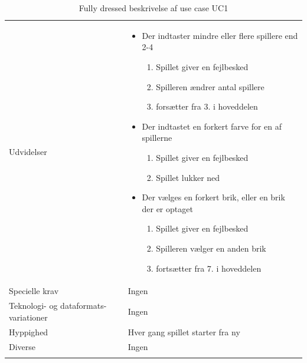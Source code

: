 \begin{center}
\begin{longtable}{ |l|p{10.7cm}|}
\begin{minipage}[t]{1\textwidth}
  \end{minipage}
  \\
 \hline
 Udvidelser & 
\begin{minipage}[t]{1\textwidth}
 \begin{itemize}
     \item Der indtaster mindre eller flere spillere end 2-4
        \begin{enumerate}
            \item Spillet giver en fejlbesked
            \item Spilleren ændrer antal spillere
            \item forsætter fra 3. i hoveddelen
        \end{enumerate}
    \item Der indtastet en forkert farve for en af spillerne
    \begin{enumerate}
        \item Spillet giver en fejlbesked
        \item Spillet lukker ned
    \end{enumerate}
    \item Der vælges en forkert brik, eller en brik der er optaget
    \begin{enumerate}
        \item Spillet giver en fejlbesked
        \item Spilleren vælger en anden brik
        \item fortsætter fra 7. i hoveddelen
    \end{enumerate}
 \end{itemize}
\end{minipage}
 
 \\
 \hline
 Specielle krav & Ingen \\
 \hline
 Teknologi- og dataformats-variationer & Ingen \\
 \hline
 Hyppighed & Hver gang spillet starter fra ny \\
 \hline
 Diverse & Ingen \\
 \hline
\caption{Fully dressed beskrivelse af use case UC1}
\label{table:uc1}
\end{longtable}
\end{center}
